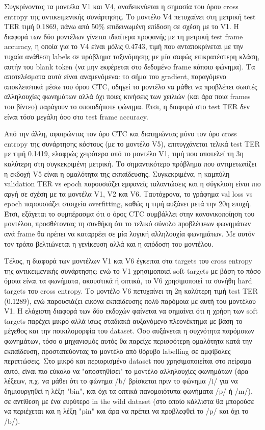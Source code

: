 Συγκρίνοντας τα μοντέλα V1 και V4, αναδεικνύεται η σημασία του όρου cross entropy της αντικειμενικής συνάρτησης. Το μοντέλο V4 πετυχαίνει στη μετρική test TER τιμή 0.1869, πάνω από 50\% επιδεινωμένη επίδοση σε σχέση με το V1. Η διαφορά των δύο μοντέλων γίνεται ιδιαίτερα προφανής με τη μετρική test frame accuracy, η οποία για το V4 είναι μόλις 0.4743, τιμή που ανταποκρίνεται με την τυχαία ανάθεση labels σε πρόβλημα ταξινόμησης με μία σαφώς επικρατέστερη κλάση, αυτήν του blank token (να μην εκφέρεται στο δεδομένο frame κάποιο φώνημα). Τα αποτελέσματα αυτά είναι αναμενόμενα: το σήμα του gradient, παραγόμενο αποκλειστικά μέσω του όρου CTC, οδηγεί το μοντέλο να μάθει να προβλέπει σωστές αλληλουχίες φωνημάτων αλλά όχι ποιες κινήσεις των χειλιών (και άρα ποια frames του βίντεο) παράγουν το οποιοδήποτε φώνημα. Έτσι, η διαφορά στο test TER δεν είναι τόσο μεγάλη όσο στο test frame accuracy.

Από την άλλη, αφαιρώντας τον όρο CTC και διατηρώντας μόνο τον όρο cross entropy της συνάρτησης κόστους (με το μοντέλο V5), επιτυγχάνεται τελικά test TER με τιμή 0.1419, ελαφρώς χειρότερα από το μοντέλο V1, τιμή που αποτελεί τη 3η καλύτερη στη συγκεκριμένη μετρική. Το σημαντικότερο πρόβλημα που αντιμετωπίζει η εκδοχή V5 είναι η ομαλότητα της εκπαίδευσης. Συγκεκριμένα, η καμπύλη validation TER vs epoch παρουσιάζει εμφανείς ταλαντώσεις και η σύγκλιση είναι πιο αργή σε σχέση με τα μοντέλα V1, V2 και V6. Ταυτόχρονα, το γράφημα val loss vs epoch παρουσιάζει στοιχεία overfitting, καθώς η τιμή αυξάνει μετά την 20η εποχή. Έτσι, εξάγεται το συμπέρασμα ότι ο όρος CTC συμβάλλει στην κανονικοποίηση του μοντέλου, προσθέτοντας τη συνθήκη ότι το τελικό σύνολο προβλέψεων φωνημάτων ανά frame θα πρέπει να καταρρέει σε μία λογική αλληλουχία φωνημάτων. Με αυτόν τον τρόπο βελτιώνεται η γενίκευση αλλά και η απόδοση του μοντέλου.

Τέλος, η διαφορά των μοντέλων V1 και V6 έγκειται στα targets του cross entropy της αντικειμενικής συνάρτησης: ενώ το V1 χρησιμοποιεί soft targets με βάση το πόσο όμοια είναι τα φωνήματα, ακουστικά ή οπτικά, το V6 χρησιμοποιεί τα συνήθη hard targets του cross entropy. Το μοντέλο V6 πετυχαίνει τη 2η καλύτερη τιμή test TER (0.1289), ενώ παρουσιάζει εικόνα εκπαίδευσης πολύ παρόμοια με αυτή του μοντέλου V1. Η ελάχιστη διαφορά των δύο εκδοχών φαίνεται να σημαίνει ότι η χρήση των soft targets παρέχει μικρό αλλά ίσως σταδιακά αυξανόμενο πλεονέκτημα με βάση το μέγεθος και την ποικιλομορφία του dataset. Όσο αυξάνεται η συχνότητα παρόμοιων φωνημάτων, τόσο ο μηχανισμός αυτός θα παρείχε περισσότερη ομαλότητα κατά την εκπαίδευση, προστατεύοντας το μοντέλο από θόρυβο labelling σε αμφίβολες περιπτώσεις. Στο μικρό και περιορισμένο dataset που χρησιμοποιείται στο πείραμα αυτό, είναι πιο εύκολο να "αποστηθίσει" το μοντέλο αλληλουχίες φωνημάτων (άρα λέξεων, π.χ. να μάθει ότι το φώνημα /b/ βρίσκεται πριν το φώνημα /i/ για να δημιουργηθεί η λέξη "bin", και όχι τα οπτικά πανομοιότυπα φωνήματα /p/ ή /m/), σε αντίθεση με ένα ευρύτερο in the wild dataset (στο οποίο κάλλιστα θα μπορούσε να περιέχεται και η λέξη "pin" και άρα να πρέπει να προβλεφθεί το /p/ και όχι το /b/). 

